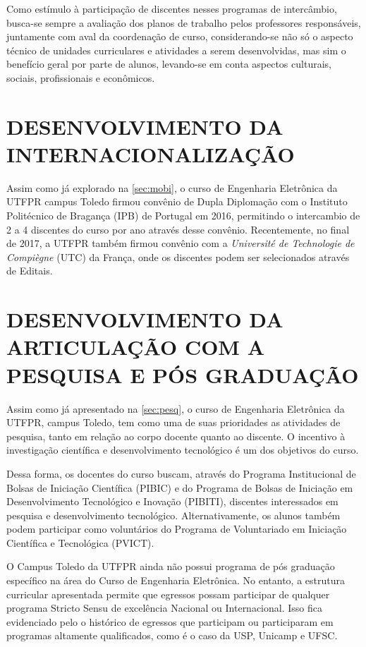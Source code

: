 Como estímulo à participação de discentes nesses programas de intercâmbio, busca-se sempre a avaliação dos planos de trabalho pelos professores responsáveis, juntamente com aval da coordenação de curso, considerando-se não só o aspecto técnico de unidades curriculares e atividades a serem desenvolvidas, mas sim o benefício geral por parte de alunos, levando-se em conta aspectos culturais, sociais, profissionais e econômicos.

\section{DESENVOLVIMENTO DA INTERNACIONALIZAÇÃO}

Assim como já explorado na \autoref{sec:mobi}, o curso de Engenharia Eletrônica da UTFPR campus Toledo firmou convênio de Dupla Diplomação com o Instituto Politécnico de Bragança (IPB) de Portugal em 2016, permitindo o intercambio de 2 a 4 discentes do curso por ano através desse convênio. Recentemente, no final de 2017, a UTFPR também firmou convênio com a \textit{Université de Technologie de Compiègne} (UTC) da França, onde os discentes podem ser selecionados através de Editais.

\section{DESENVOLVIMENTO DA ARTICULAÇÃO COM A PESQUISA E PÓS GRADUAÇÃO}

Assim como já apresentado na \autoref{sec:pesq}, o curso de Engenharia Eletrônica da UTFPR, campus Toledo, tem como uma de suas prioridades as atividades de pesquisa, tanto em relação ao corpo docente quanto ao discente. O incentivo à investigação científica e desenvolvimento tecnológico é um dos objetivos do curso.

Dessa forma, os docentes do curso buscam, através do Programa Institucional de Bolsas de Iniciação Científica (PIBIC) e do Programa de Bolsas de Iniciação em Desenvolvimento Tecnológico e Inovação (PIBITI), discentes interessados em pesquisa e desenvolvimento tecnológico. Alternativamente, os alunos também podem participar como voluntários do Programa de Voluntariado em Iniciação Científica e Tecnológica (PVICT).

O Campus Toledo da UTFPR ainda não possui programa de pós graduação específico na área do Curso de Engenharia Eletrônica. No entanto, a estrutura curricular apresentada permite que egressos possam participar de qualquer programa Stricto Sensu de excelência Nacional ou Internacional. Isso fica evidenciado pelo o histórico de egressos que participam ou participaram em programas altamente qualificados, como é o caso da USP, Unicamp e UFSC.

